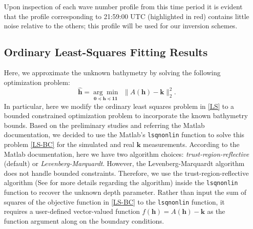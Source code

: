 Upon inspection of each wave number profile from this time period it is evident that the profile corresponding to 21:59:00 UTC (highlighted in red) contains little noise relative to the others; this profile will be used for our inversion schemes.


\subsection{Ordinary Least-Squares Fitting Results}
Here, we approximate the unknown bathymetry by solving the following optimization problem:
\begin{equation}\label{LS-BC}
\mathbf{\hat{h}}= \underset{\mathbf{0} \preceq \mathbf{h} \preceq \mathbf{11} }{\arg \min} \ \  \|  A(\mathbf{h}) -  \mathbf{k} \|_2^2.
\end{equation}
In particular, here we modify the ordinary least squares problem in \eqref{LS} to a bounded constrained optimization problem to incorporate the known bathymetry bounds. Based on the preliminary studies and referring the Matlab documentation, we decided to use the Matlab's \verb|lsqnonlin| function to solve this problem \eqref{LS-BC} for the simulated and real $\mathbf{k}$ measurements. According to the Matlab documentation, here we have two algorithm choices: \textit{trust-region-reflective} (default) or \textit{Levenberg-Marquardt}. However, the Levenberg-Marquardt algorithm does not handle bounded constraints. Therefore, we use the trust-region-reflective algorithm (See \cite{trustregion} for more details regarding the algorithm) inside the \verb|lsqnonlin| function to recover the unknown depth parameter. Rather than input the sum of squares of the objective function in \eqref{LS-BC} to the \verb|lsqnonlin| function, it requires a user-defined vector-valued function $f(\mathbf{h}) = A(\mathbf{h}) -  \mathbf{k}$ as the function argument along on the boundary conditions. 

